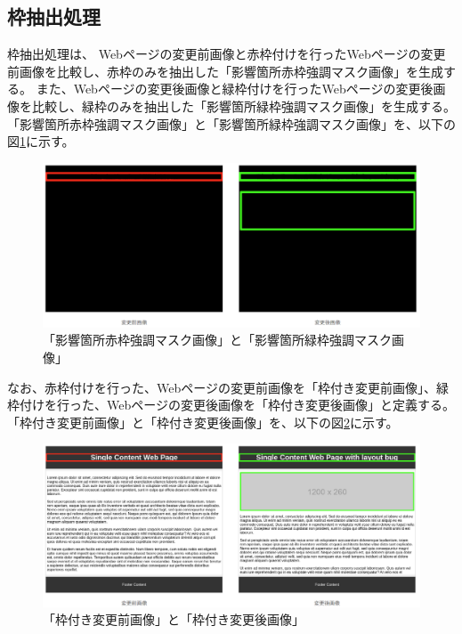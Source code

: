 
\subsection{枠抽出処理}\label{subsec:frame_extraction}
枠抽出処理は、
Webページの変更前画像と赤枠付けを行ったWebページの変更前画像を比較し、赤枠のみを抽出した「影響箇所赤枠強調マスク画像」を生成する。
また、Webページの変更後画像と緑枠付けを行ったWebページの変更後画像を比較し、緑枠のみを抽出した「影響箇所緑枠強調マスク画像」を生成する。
「影響箇所赤枠強調マスク画像」と「影響箇所緑枠強調マスク画像」を、以下の図\ref{fig: html_diff_mask}に示す。
\begin{figure}[tp]
    \begin{center}
        \includegraphics[width=1.0\columnwidth]{image/4_html_diff_mask.png}
        \caption{「影響箇所赤枠強調マスク画像」と「影響箇所緑枠強調マスク画像」}
        \label{fig: html_diff_mask}
    \end{center}
\end{figure}
なお、赤枠付けを行った、Webページの変更前画像を「枠付き変更前画像」、緑枠付けを行った、Webページの変更後画像を「枠付き変更後画像」と定義する。
「枠付き変更前画像」と「枠付き変更後画像」を、以下の図\ref{fig: html_waku}に示す。
\par
\begin{figure}[tp]
    \begin{center}
        \includegraphics[width=1.0\columnwidth]{image/4_html_waku.png}
        \caption{「枠付き変更前画像」と「枠付き変更後画像」}
        \label{fig: html_waku}
    \end{center}
\end{figure}
